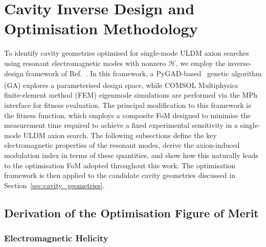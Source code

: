 \documentclass[
  aps,
  physrev,
  reprint,
  superscriptaddress,
  nofootinbib,
  amsmath,
  amssymb
]{revtex4-2}
\begin{document}



\section{Cavity Inverse Design and Optimisation Methodology}

To identify cavity geometries optimised for single-mode ULDM axion searches using resonant electromagnetic modes with nonzero $\mathscr H$, we employ the inverse-design framework of Ref.~\cite{Paterson2026InverseDesign}. In this framework, a PyGAD-based~\cite{gad2023pygad} genetic algorithm (GA) explores a parameterised design space, while COMSOL Multiphysics\textsuperscript{\textregistered}~\cite{comsol_multiphysics_v6.4} finite-element method (FEM) eigenmode simulations are performed via the MPh interface for fitness evaluation. The principal modification to this framework is the fitness function, which employs a composite FoM designed to minimise the measurement time required to achieve a fixed experimental sensitivity in a single-mode ULDM axion search. The following subsections define the key electromagnetic properties of the resonant modes, derive the axion-induced modulation index in terms of these quantities, and show how this naturally leads to the optimisation FoM adopted throughout this work. The optimisation framework is then applied to the candidate cavity geometries discussed in Section~\ref{sec:cavity_geometries}.

\subsection{Derivation of the Optimisation Figure of Merit}
\label{sec:FOMderivation}

\subsubsection{Electromagnetic Helicity}
\label{sec:helicity}
\end{document}
